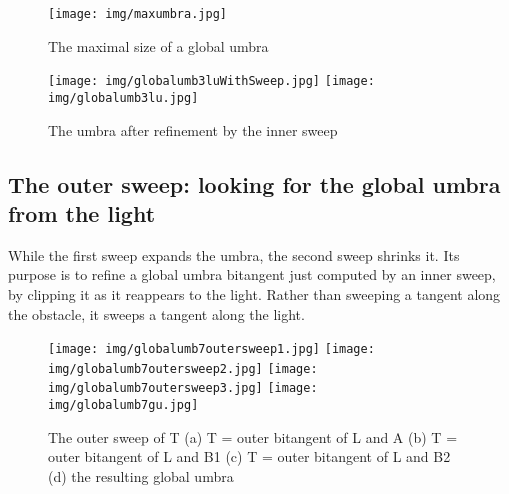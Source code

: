 \documentclass[9pt]{article}
\newif\ifTalk
\begin{document}

\ifTalk
Animation of sweep.
\fi

\begin{figure}[h]
\begin{center}
\texttt{[image: img/maxumbra.jpg]}
\end{center}
\caption{The maximal size of a global umbra}
\label{fig:maximalumbra}
\end{figure}

\begin{figure}[h]
\begin{center}
\texttt{[image: img/globalumb3luWithSweep.jpg]}
\texttt{[image: img/globalumb3lu.jpg]}
\end{center}
\caption{The umbra after refinement by the inner sweep}
\label{fig:umbraafterinnersweep}
\end{figure}



\subsection{The outer sweep: looking for the global umbra from the light}
\label{sec:outersweep}

While the first sweep expands the umbra, the second sweep shrinks it.
Its purpose is to refine a global umbra bitangent just computed by an
inner sweep, by clipping it as it reappears to the light.
Rather than sweeping a tangent along the obstacle,
it sweeps a tangent along the light.

\begin{figure}[h]
\begin{center}
\texttt{[image: img/globalumb7outersweep1.jpg]}
\texttt{[image: img/globalumb7outersweep2.jpg]}
\texttt{[image: img/globalumb7outersweep3.jpg]}
\texttt{[image: img/globalumb7gu.jpg]}
\end{center}
\caption{The outer sweep of T (a) T = outer bitangent of L and A
	 (b) T = outer bitangent of L and B1
	 (c) T = outer bitangent of L and B2
	 (d) the resulting global umbra}
\label{fig:severalstages}
\end{figure}
\end{document}
